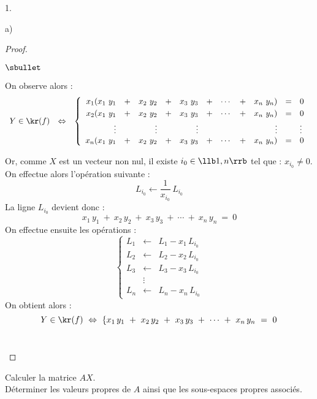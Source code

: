 \begin{noliste}{1.}
\begin{noliste}{a)}
\begin{proof}
\begin{noliste}{$\sbullet$}
    
    On observe alors :
    \[
    \begin{array}{rcl}
      Y \in \kr(f) & \Leftrightarrow &
      \left\{
      \begin{array}{rrrrrrrrrcl}
       x_1(x_1 \ y_1 & + & x_2 \ y_2 & + & x_3 \ y_3 & + & 
       \cdots & + & x_n \ y_n) & = & 0
       \\[.1cm]
       x_2 (x_1 \ y_1 & + & x_2 \ y_2 & + & x_3 \ y_3 & + & 
       \cdots & + & x_n \ y_n) & = & 0
       \\[.1cm]
       \vdots & & \vdots & & \vdots & & & & \vdots & & \vdots
       \\
       x_n (x_1 \ y_1 & + & x_2 \ y_2 & + & x_3 \ y_3 & + & 
       \cdots & + & x_n \ y_n) & = & 0
      \end{array}
      \right.
     \end{array}
    \]

    Or, comme $X$ est un vecteur non nul, il existe $i_0\in 
    \llb 1,n \rrb$ tel que : $x_{i_0} \neq 0$.\\
    On effectue alors l'opération suivante :
    \[
      L_{i_0} \leftarrow \dfrac{1}{x_{i_0}} \, L_{i_0}
    \]
    La ligne $L_{i_0}$ devient donc :
    \[
      x_1 \, y_1 \ + \ x_2 \, y_2 \ + \ x_3 \, y_3 \ + \
      \cdots \ + \ x_n \, y_n \ = \ 0
    \]
    On effectue ensuite les opérations :
    \[
     \left\{
     \begin{array}{rcl}
      L_1 & \leftarrow & L_1 - x_1 \, L_{i_0}\\
      L_2 & \leftarrow & L_2 - x_2 \, L_{i_0}\\
      L_3 & \leftarrow & L_3 - x_3 \, L_{i_0}\\
       & \vdots & \\
      L_n & \leftarrow & L_n - x_n \, L_{i_0}
     \end{array}
     \right.
    \]
    On obtient alors :
    \[
     Y \in \kr(f) \ \Leftrightarrow \ 
     \left\{
      x_1 \, y_1 \ + \ x_2 \, y_2 \ + \ x_3 \, y_3 \ + \
      \cdots \ + \ x_n \, y_n \ = \ 0
      \right.
    \]
    ~\\[-1.4cm]
   \end{noliste}
  \end{proof}

  
  \item Calculer la matrice $AX$. \\
  Déterminer les valeurs propres de $A$ 
  ainsi que les sous-espaces propres associés.
  

\end{noliste}
\end{noliste}
